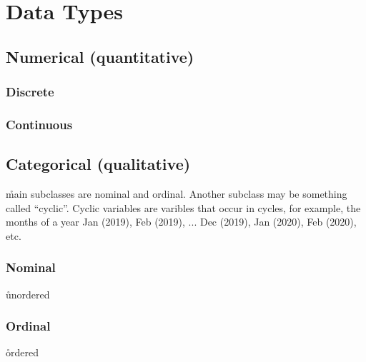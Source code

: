 \section{Data Types}



\subsection{Numerical (quantitative)}

\subsubsection{Discrete}

\subsubsection{Continuous}

\subsection{Categorical (qualitative)}

\r{main subclasses are nominal and ordinal. Another subclass may be something called ``cyclic''. Cyclic variables are varibles that occur in cycles, for example, the months of a year Jan (2019), Feb (2019), ... Dec (2019), Jan (2020), Feb (2020), etc.}

\subsubsection{Nominal}

\r{unordered}


\subsubsection{Ordinal}

\r{ordered}


